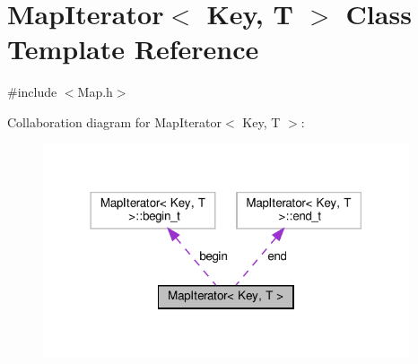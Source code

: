 \hypertarget{classMapIterator}{}\section{Map\+Iterator$<$ Key, T $>$ Class Template Reference}
\label{classMapIterator}


{\ttfamily \#include $<$Map.\+h$>$}



Collaboration diagram for Map\+Iterator$<$ Key, T $>$\+:\nopagebreak
\begin{figure}[H]
\begin{center}
\leavevmode
\includegraphics[width=306pt]{classMapIterator__coll__graph}
\end{center}
\end{figure}
